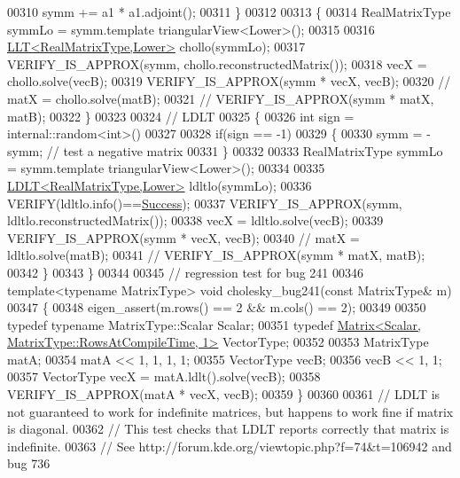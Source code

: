 \begin{DoxyCode}
00310     symm += a1 * a1.adjoint();
00311   \}
00312 
00313   \{
00314     RealMatrixType symmLo = symm.template triangularView<Lower>();
00315 
00316     \hyperlink{group___cholesky___module_class_eigen_1_1_l_l_t}{LLT<RealMatrixType,Lower>} chollo(symmLo);
00317     VERIFY\_IS\_APPROX(symm, chollo.reconstructedMatrix());
00318     vecX = chollo.solve(vecB);
00319     VERIFY\_IS\_APPROX(symm * vecX, vecB);
00320 \textcolor{comment}{//     matX = chollo.solve(matB);}
00321 \textcolor{comment}{//     VERIFY\_IS\_APPROX(symm * matX, matB);}
00322   \}
00323 
00324   \textcolor{comment}{// LDLT}
00325   \{
00326     \textcolor{keywordtype}{int} sign = internal::random<int>()%
00327 
00328     \textcolor{keywordflow}{if}(sign == -1)
00329     \{
00330       symm = -symm; \textcolor{comment}{// test a negative matrix}
00331     \}
00332 
00333     RealMatrixType symmLo = symm.template triangularView<Lower>();
00334 
00335     \hyperlink{group___cholesky___module_class_eigen_1_1_l_d_l_t}{LDLT<RealMatrixType,Lower>} ldltlo(symmLo);
00336     VERIFY(ldltlo.info()==\hyperlink{group__enums_gga85fad7b87587764e5cf6b513a9e0ee5ea52581b035f4b59c203b8ff999ef5fcea}{Success});
00337     VERIFY\_IS\_APPROX(symm, ldltlo.reconstructedMatrix());
00338     vecX = ldltlo.solve(vecB);
00339     VERIFY\_IS\_APPROX(symm * vecX, vecB);
00340 \textcolor{comment}{//     matX = ldltlo.solve(matB);}
00341 \textcolor{comment}{//     VERIFY\_IS\_APPROX(symm * matX, matB);}
00342   \}
00343 \}
00344 
00345 \textcolor{comment}{// regression test for bug 241}
00346 \textcolor{keyword}{template}<\textcolor{keyword}{typename} MatrixType> \textcolor{keywordtype}{void} cholesky\_bug241(\textcolor{keyword}{const} MatrixType& m)
00347 \{
00348   eigen\_assert(m.rows() == 2 && m.cols() == 2);
00349 
00350   \textcolor{keyword}{typedef} \textcolor{keyword}{typename} MatrixType::Scalar Scalar;
00351   \textcolor{keyword}{typedef} \hyperlink{group___core___module_class_eigen_1_1_matrix}{Matrix<Scalar, MatrixType::RowsAtCompileTime, 1>} 
      VectorType;
00352 
00353   MatrixType matA;
00354   matA << 1, 1, 1, 1;
00355   VectorType vecB;
00356   vecB << 1, 1;
00357   VectorType vecX = matA.ldlt().solve(vecB);
00358   VERIFY\_IS\_APPROX(matA * vecX, vecB);
00359 \}
00360 
00361 \textcolor{comment}{// LDLT is not guaranteed to work for indefinite matrices, but happens to work fine if matrix is diagonal.}
00362 \textcolor{comment}{// This test checks that LDLT reports correctly that matrix is indefinite.}
00363 \textcolor{comment}{// See http://forum.kde.org/viewtopic.php?f=74&t=106942 and bug 736}

\end{DoxyCode}
